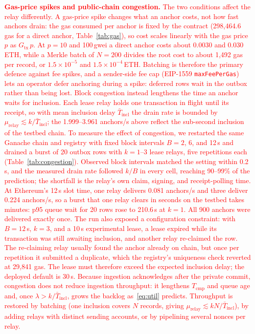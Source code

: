 \documentclass[final,5p,times,twocolumn]{elsarticle}
\begin{document}
\textcolor{red}{\textbf{Gas-price spikes and public-chain congestion.} The two conditions affect the relay differently. A gas-price spike changes what an anchor costs, not how fast anchors drain: the gas consumed per anchor is fixed by the contract (298{,}464.6 gas for a direct anchor, Table~\ref{tab:gas}), so cost scales linearly with the gas price $p$ as $G_{\mathrm{tx}}\,p$. At $p=10$ and 100\,gwei a direct anchor costs about 0.0030 and 0.030\,ETH, while a Merkle batch of $N=200$ divides the root cost to about 1{,}492 gas per record, or $1.5\times10^{-5}$ and $1.5\times10^{-4}$\,ETH. Batching is therefore the primary defence against fee spikes, and a sender-side fee cap (EIP-1559 \texttt{maxFeePerGas}) lets an operator defer anchoring during a spike: deferred rows wait in the outbox rather than being lost. Block congestion instead lengthens the time an anchor waits for inclusion. Each lease relay holds one transaction in flight until its receipt, so with mean inclusion delay $\bar{T}_{\mathrm{incl}}$ the drain rate is bounded by $\mu_{\mathrm{relay}}\lesssim k/\bar{T}_{\mathrm{incl}}$; the 1.999--3.961 anchors/s above reflect the sub-second inclusion of the testbed chain. To measure the effect of congestion, we restarted the same Ganache chain and registry with fixed block intervals $B=2$, 6, and 12\,s and drained a burst of 20 outbox rows with $k=1$--3 lease relays, five repetitions each (Table~\ref{tab:congestion}). Observed block intervals matched the setting within 0.2\,s, and the measured drain rate followed $k/B$ in every cell, reaching 90--99\% of the prediction; the shortfall is the relay's own claim, signing, and receipt-polling time. At Ethereum's 12\,s slot time, one relay delivers 0.081 anchors/s and three deliver 0.224 anchors/s, so a burst that one relay clears in seconds on the testbed takes minutes: p95 queue wait for 20 rows rose to 210.6\,s at $k=1$. All 900 anchors were delivered exactly once. The run also exposed a configuration constraint: with $B=12$\,s, $k=3$, and a 10\,s experimental lease, a lease expired while its transaction was still awaiting inclusion, and another relay re-claimed the row. The re-claiming relay usually found the anchor already on chain, but once per repetition it submitted a duplicate, which the registry's uniqueness check reverted at 29{,}841 gas. The lease must therefore exceed the expected inclusion delay; the deployed default is 30\,s. Because ingestion acknowledges after the private commit, congestion does not reduce ingestion throughput: it lengthens $T_{\mathrm{cmp}}$ and queue age and, once $\lambda>k/\bar{T}_{\mathrm{incl}}$, grows the backlog as~\eqref{eq:util} predicts. Throughput is restored by batching (one inclusion covers $N$ records, giving $\mu_{\mathrm{relay}}\lesssim kN/\bar{T}_{\mathrm{incl}}$), by adding relays with distinct sending accounts, or by pipelining several nonces per relay.}
\end{document}
